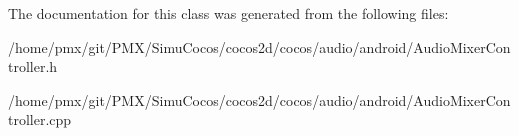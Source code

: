 The documentation for this class was generated from the following files\+:\begin{DoxyCompactItemize}
\item 
/home/pmx/git/\+P\+M\+X/\+Simu\+Cocos/cocos2d/cocos/audio/android/Audio\+Mixer\+Controller.\+h\item 
/home/pmx/git/\+P\+M\+X/\+Simu\+Cocos/cocos2d/cocos/audio/android/Audio\+Mixer\+Controller.\+cpp\end{DoxyCompactItemize}
